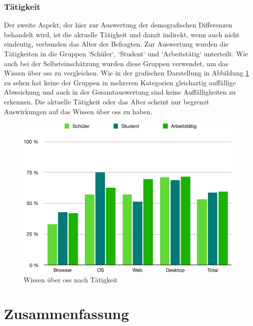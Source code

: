 \documentclass[a4paper]{article}
\begin{document}
            \subsubsection{Tätigkeit}
                Der zweite Aspekt, der hier zur Auswertung der demografischen Differenzen behandelt wird, ist die aktuelle Tätigkeit und damit indirekt, wenn auch nicht eindeutig, verbunden das Alter der Befragten. Zur Auswertung wurden die Tätigkeiten in die Gruppen `Schüler`, `Student` und `Arbeitstätig` unterteilt. Wie auch bei der Selbsteinschätzung wurden diese Gruppen verwendet, um das Wissen über \gls{oss} zu vergleichen. Wie in der grafischen Darstellung in Abbildung \ref{figure:knowledge_by_occupation} zu sehen hat keine der Gruppen in mehreren Kategorien gleichartig auffällige Abweichung und auch in der Gesamtauswertung sind keine Auffälligkeiten zu erkennen. Die aktuelle Tätigkeit oder das Alter scheint nur begrenzt Auswirkungen auf das Wissen über \gls{oss} zu haben.
            
            \begin{figure}
                \includegraphics[width=\textwidth]{assets/results/openSourceJudging/openSourceJudgingDetailedOSSOnlyByOccupation.pdf}
                \caption{Wissen über \gls{oss} nach Tätigkeit}
                \label{figure:knowledge_by_occupation}
            \end{figure}
            
    
    
    \clearpage
    \section{Zusammenfassung}
\end{document}
